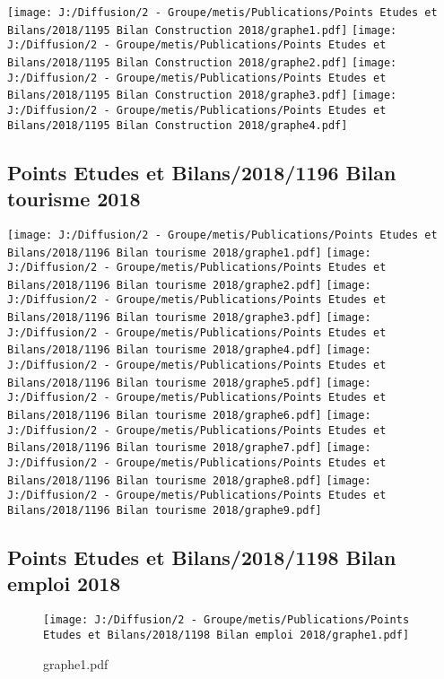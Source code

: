 \documentclass[
]{article}
\begin{document}
\texttt{[image: J:/Diffusion/2 - Groupe/metis/Publications/Points Etudes et Bilans/2018/1195 Bilan Construction 2018/graphe1.pdf]}
\texttt{[image: J:/Diffusion/2 - Groupe/metis/Publications/Points Etudes et Bilans/2018/1195 Bilan Construction 2018/graphe2.pdf]}
\texttt{[image: J:/Diffusion/2 - Groupe/metis/Publications/Points Etudes et Bilans/2018/1195 Bilan Construction 2018/graphe3.pdf]}
\texttt{[image: J:/Diffusion/2 - Groupe/metis/Publications/Points Etudes et Bilans/2018/1195 Bilan Construction 2018/graphe4.pdf]}

\hypertarget{points-etudes-et-bilans20181196-bilan-tourisme-2018}{%
\subsection{Points Etudes et Bilans/2018/1196 Bilan tourisme
2018}\label{points-etudes-et-bilans20181196-bilan-tourisme-2018}}

\texttt{[image: J:/Diffusion/2 - Groupe/metis/Publications/Points Etudes et Bilans/2018/1196 Bilan tourisme 2018/graphe1.pdf]}
\texttt{[image: J:/Diffusion/2 - Groupe/metis/Publications/Points Etudes et Bilans/2018/1196 Bilan tourisme 2018/graphe2.pdf]}
\texttt{[image: J:/Diffusion/2 - Groupe/metis/Publications/Points Etudes et Bilans/2018/1196 Bilan tourisme 2018/graphe3.pdf]}
\texttt{[image: J:/Diffusion/2 - Groupe/metis/Publications/Points Etudes et Bilans/2018/1196 Bilan tourisme 2018/graphe4.pdf]}
\texttt{[image: J:/Diffusion/2 - Groupe/metis/Publications/Points Etudes et Bilans/2018/1196 Bilan tourisme 2018/graphe5.pdf]}
\texttt{[image: J:/Diffusion/2 - Groupe/metis/Publications/Points Etudes et Bilans/2018/1196 Bilan tourisme 2018/graphe6.pdf]}
\texttt{[image: J:/Diffusion/2 - Groupe/metis/Publications/Points Etudes et Bilans/2018/1196 Bilan tourisme 2018/graphe7.pdf]}
\texttt{[image: J:/Diffusion/2 - Groupe/metis/Publications/Points Etudes et Bilans/2018/1196 Bilan tourisme 2018/graphe8.pdf]}
\texttt{[image: J:/Diffusion/2 - Groupe/metis/Publications/Points Etudes et Bilans/2018/1196 Bilan tourisme 2018/graphe9.pdf]}

\hypertarget{points-etudes-et-bilans20181198-bilan-emploi-2018}{%
\subsection{Points Etudes et Bilans/2018/1198 Bilan emploi
2018}\label{points-etudes-et-bilans20181198-bilan-emploi-2018}}

\begin{figure}
\centering
\texttt{[image: J:/Diffusion/2 - Groupe/metis/Publications/Points Etudes et Bilans/2018/1198 Bilan emploi 2018/graphe1.pdf]}
\caption{graphe1.pdf}
\end{figure}
\end{document}

